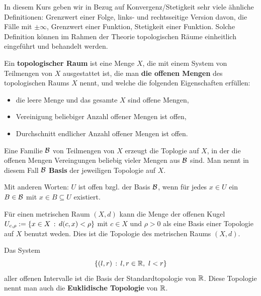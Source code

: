 \begin{bem}
	In diesem Kurs geben wir in Bezug auf Konvergenz/Stetigkeit sehr viele ähnliche Definitionen: Grenzwert einer Folge, links- und rechtsseitige Version davon, die Fälle mit $\pm \infty$, Grenzwert einer Funktion, Stetigkeit einer Funktion. Solche Definition können im Rahmen der Theorie topologischen Räume einheitlich eingeführt und behandelt werden. 
\end{bem} 

\begin{defn}
	Ein \textbf{topologischer Raum} ist eine Menge $X$, die mit einem System von Teilmengen von $X$ ausgestattet ist, die man \textbf{die offenen Mengen} des topologischen Raums $X$ nennt, und welche die folgenden Eigenschaften erfüllen: 
	\begin{itemize} 
		\item die leere Menge und das gesamte $X$ sind offene Mengen, 
		\item Vereinigung beliebiger Anzahl offener Mengen ist offen,
		\item Durchschnitt endlicher Anzahl offener Mengen ist offen. 
	\end{itemize} 
\end{defn} 


\begin{defn}
	Eine Familie $\mathcal{B}$ von Teilmengen von $X$ erzeugt die Toplogie auf $X$, in der die offenen Mengen Vereingungen beliebig vieler Mengen aus $\mathcal{B}$ sind. 	Man nennt in diesem Fall $\mathcal{B}$ \textbf{Basis} der jeweiligen Topologie auf $X$. 
	
	Mit anderen Worten: $U$ ist offen bzgl. der Basis $\mathcal{B}$, wenn für jedes $x \in U$ ein $B \in \mathcal{B}$ mit $x \in B \subseteq U$ existiert. 
\end{defn} 

\begin{bem}
	Für einen metrischen Raum $(X,d)$ kann die Menge der offenen Kugel $U_{c,\rho}:=\left\{ x \in X \,:\, d(c,x) < \rho \right\}$ mit $c \in X$ und $\rho>0$ als eine Basis einer Topologie auf $X$ benutzt weden. Dies ist die Topologie des metrischen Raums $(X,d)$. 
\end{bem} 

\begin{bem}
	Das System 
	\[
		\left\{  (l,r)  \,:\, l,r \in \mathbb{R}, \ l < r \right\}
	\]
	aller offenen Intervalle ist die Basis der Standardtopologie von $\mathbb{R}$. Diese Topologie nennt man auch die \textbf{Euklidische Topologie} von $\mathbb{R}$. 
\end{bem} 



